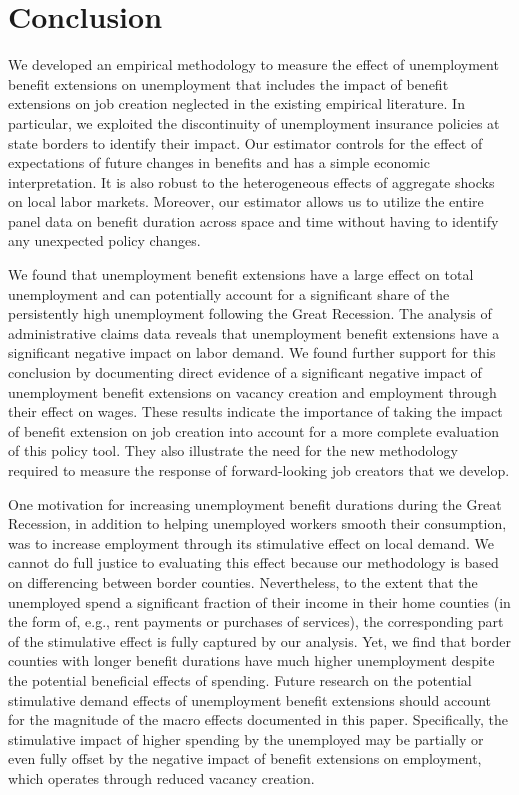 \documentclass[12pt]{article}
\newcommand{\1}{\mathbf{1}}
\begin{document}
\section{Conclusion}
We developed an empirical methodology to measure the effect of unemployment benefit extensions on unemployment that includes the impact of benefit extensions on job creation neglected in the existing empirical literature. In particular, we exploited the discontinuity of unemployment insurance policies at state borders to identify their impact. Our estimator controls for the effect of expectations of future changes in benefits and has a simple economic interpretation. It is also robust to the heterogeneous effects of aggregate shocks on local labor markets.  Moreover, our estimator allows us to utilize
the entire panel data on benefit duration across space and time without having to identify any unexpected policy changes.

We found that unemployment benefit extensions have a large effect on total unemployment and can potentially account for a significant share of the persistently high unemployment following the Great Recession. The analysis of administrative claims data reveals that unemployment benefit extensions have a significant negative impact on labor demand. We found further support for this conclusion by documenting direct evidence of a significant negative impact of unemployment benefit extensions on vacancy creation and employment through their effect on wages. These results indicate the importance of taking the impact of benefit extension on job creation into account for a more complete evaluation of this policy tool. They also illustrate the need for the new methodology required to measure the response of forward-looking job creators that we develop.




One motivation for increasing unemployment benefit durations during the Great Recession, in addition to helping unemployed workers smooth their consumption, was to increase employment through its stimulative effect on local demand. We cannot do full justice to evaluating this effect because our methodology is based on differencing between border counties. Nevertheless, to the extent that the unemployed spend a significant fraction of their income in their home counties (in the form of, e.g., rent payments or purchases of services), the corresponding part of the stimulative effect is fully captured by our analysis. Yet, we find that border counties with longer benefit durations have much higher unemployment despite the potential beneficial effects of spending. Future research on the potential stimulative demand effects of unemployment benefit extensions should account for the magnitude of the macro effects documented in this paper. Specifically, the stimulative impact of higher spending by the unemployed may be partially or even fully offset by the negative impact of benefit extensions on employment, which operates through reduced vacancy creation.
\end{document}
